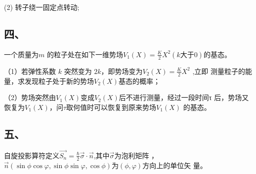 (2) 转子绕一固定点转动;
\subsection{四、}
一个质量为$m$ 的粒子处在如下一维势场$V_1(X) = \frac{K}{2}X^2(k \text{大于} 0)$的基态。

（1）若弹性系数 $k$ 突然变为 $2k$，即势场变为$V_2(X) = \frac{K}{2}X^2$ ,立即
测量粒子的能量，求发现粒子处于新的势场$V_2(X)$基态的概率；

（2）势场突然由$V_1(X)$变成$V_2(X)$后不进行测量，经过一段时间τ
后，势场又恢复为$V_1(X)$，问$\tau$取何值时可以恢复到原来势场$V_1(X)$
的基态。
\subsection{五、}
自旋投影算符定义$\vec{S_n}=\frac{\hbar}{2}\vec{\sigma}\cdot \vec{n}$,其中$\vec{\sigma}$为泡利矩阵 ，$\vec{n}(\sin\phi\cos\varphi,\sin\phi\sin\varphi,\cos\phi)$为$(\phi,\varphi)$方向上的单位矢
量。